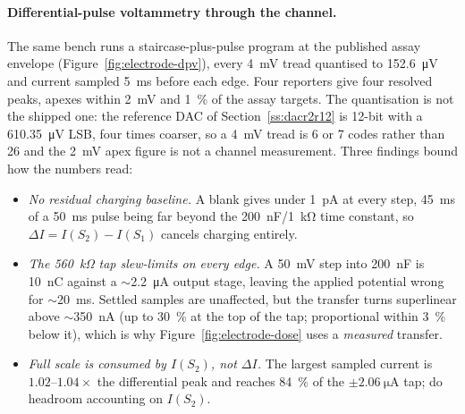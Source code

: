 
\paragraph{Differential-pulse voltammetry through the channel.} The same bench
runs a staircase-plus-pulse program at the published assay envelope
(Figure~\ref{fig:electrode-dpv}), every \SI{4}{\milli\volt} tread quantised to
\SI{152.6}{\micro\volt} and current sampled \SI{5}{\milli\second} before
each edge. Four reporters give four resolved peaks, apexes within
\SI{2}{\milli\volt} and \SI{1}{\percent} of the assay targets. The
quantisation is not the shipped one: the reference DAC of
Section~\ref{ss:dacr2r12} is 12-bit with a \SI{610.35}{\micro\volt} LSB, four
times coarser, so a \SI{4}{\milli\volt} tread is 6 or 7 codes rather than 26
and the \SI{2}{\milli\volt} apex figure is not a channel measurement. Three
findings bound how the numbers read:

\begin{itemize}[nosep]
  \item \emph{No residual charging baseline.} A blank gives under
    \SI{1}{\pico\ampere} at every step, \SI{45}{\milli\second} of a
    \SI{50}{\milli\second} pulse being far beyond the
    \SI{200}{\nano\farad}/\SI{1}{\kilo\ohm} time constant, so
    \(\Delta I = I(S_2)-I(S_1)\) cancels charging entirely.
  \item \emph{The \SI{560}{\kilo\ohm} tap slew-limits on every edge.} A
    \SI{50}{\milli\volt} step into \SI{200}{\nano\farad} is
    \SI{10}{\nano\coulomb} against a \(\sim\)\SI{2.2}{\micro\ampere} output
    stage, leaving the applied potential wrong for
    \(\sim\)\SI{20}{\milli\second}. Settled samples are unaffected, but the
    transfer turns superlinear above \(\sim\)\SI{350}{\nano\ampere} (up to
    \SI{30}{\percent} at the top of the tap; proportional within
    \SI{3}{\percent} below it), which is why
    Figure~\ref{fig:electrode-dose} uses a \emph{measured} transfer.
  \item \emph{Full scale is consumed by \(I(S_2)\), not \(\Delta I\).} The
    largest sampled current is \(1.02\)--\(1.04\times\) the differential peak
    and reaches \SI{84}{\percent} of the \(\pm\SI{2.06}{\micro\ampere}\) tap;
    do headroom accounting on \(I(S_2)\).
\end{itemize}
